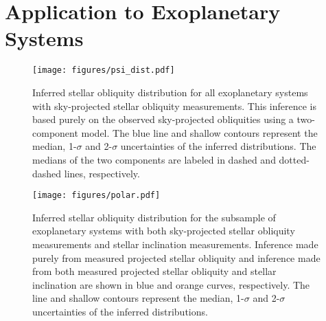 \documentclass[twocolumn,times]{aastex631}
\begin{document}
\section{Application to Exoplanetary Systems}\label{sec:observation}

\begin{figure}
    \begin{centering}
        \texttt{[image: figures/psi\_dist.pdf]}
        \caption{Inferred stellar obliquity distribution for all exoplanetary systems with sky-projected stellar obliquity measurements. This inference is based purely on the observed sky-projected obliquities using a two-component model. The blue line and shallow contours represent the median, 1-$\sigma$ and 2-$\sigma$ uncertainties of the inferred distributions. The medians of the two components are labeled in dashed and dotted-dashed lines, respectively.}
        \label{fig:psi_dist}
    \end{centering}
\end{figure}

\begin{figure*}
    \begin{centering}
        \texttt{[image: figures/polar.pdf]}
        \caption{Inferred stellar obliquity distribution for the subsample of exoplanetary systems with both sky-projected stellar obliquity measurements and stellar inclination measurements. Inference made purely from measured projected stellar obliquity and inference made from both measured projected stellar obliquity and stellar inclination are shown in blue and orange curves, respectively. The line and shallow contours represent the median, 1-$\sigma$ and 2-$\sigma$ uncertainties of the inferred distributions.}
        \label{fig:polar}
    \end{centering}
\end{figure*}
\end{document}
